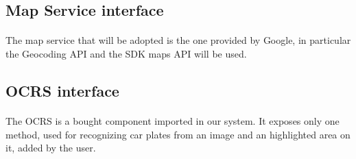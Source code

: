 			\subsection{Map Service interface}
				\paragraph{}
					The map service that will be adopted is the one provided by Google, in particular the Geocoding API and the SDK maps API will be used.
					
			\clearpage
			\subsection{OCRS interface}
				\paragraph{}
					The OCRS is a bought component imported in our system. It exposes only one method, used for recognizing car plates from an image and an highlighted area on it, added by the user.
					
